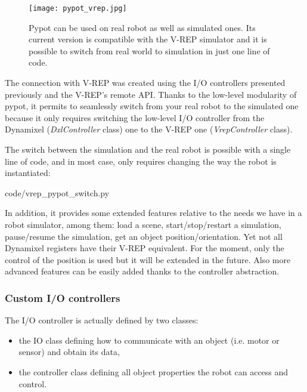\begin{figure}[tb]
    \begin{center}
        \texttt{[image: pypot\_vrep.jpg]}
    \end{center}
    \caption{Pypot can be used on real robot as well as simulated ones. Its current version is compatible with the V-REP simulator and it is possible to switch from real world to simulation in just one line of code.}
    \label{fig:pypot-vrep}
\end{figure}


The connection with V-REP was created using the I/O controllers presented previously and the V-REP’s remote API.
Thanks to the low-level modularity of pypot, it permits to seamlessly switch from your real robot to the simulated one because it only requires switching the low-level I/O controller from the Dynamixel (\emph{DxlController} class) one to the V-REP one (\emph{VrepController} class).

The switch between the simulation and the real robot is possible with a single line of code, and in most case, only requires changing the way the robot is instantiated:


    {code/vrep_pypot_switch.py}

In addition, it provides some extended features relative to the needs we have in a robot simulator, among them:
load a scene, start/stop/restart a simulation, pause/resume the simulation, get an object position/orientation.
Yet not all Dynamixel registers have their V-REP equivalent. For the moment, only the control of the position is used but it will be extended in the future. Also more advanced features can be easily added thanks to the controller abstraction.


\subsubsection{Custom I/O controllers} %

The I/O controller is actually defined by two classes:

\begin{itemize}
    \item the IO class defining how to communicate with an object (i.e. motor or sensor) and obtain its data,
    \item the controller class defining all object properties the robot can access and control.
\end{itemize}

